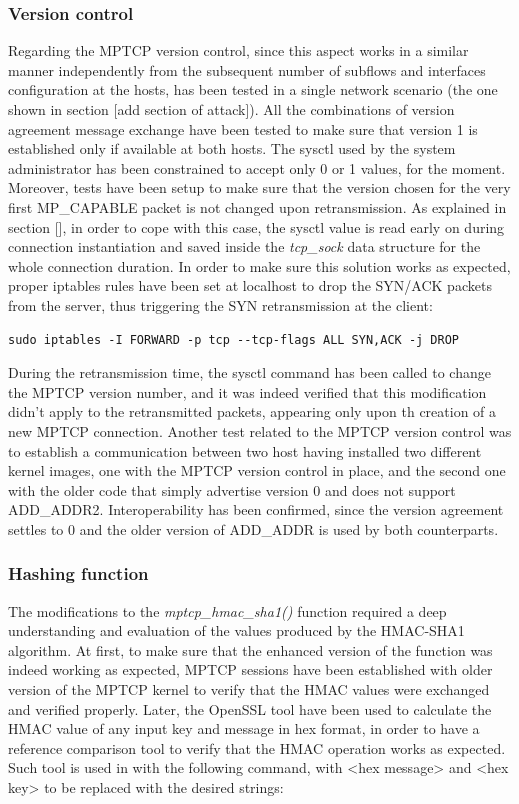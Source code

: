 \subsubsection{Version control}
Regarding the MPTCP version control, since this aspect works in a similar manner independently from the subsequent number of subflows and interfaces configuration at the hosts, has been tested in a single network scenario (the one shown in section [add section of attack]). All the combinations of version agreement message exchange have been tested to make sure that version 1 is established only if available at both hosts. The sysctl used by the system administrator has been constrained to accept only 0 or 1 values, for the moment. Moreover, tests have been setup to make sure that the version chosen for the very first MP\_CAPABLE packet is not changed upon retransmission. As explained in section [], in order to cope with this case, the sysctl value is read early on during connection instantiation and saved inside the \textit{tcp\_sock} data structure for the whole connection duration. In order to make sure this solution works as expected, proper iptables rules have been set at localhost to drop the SYN/ACK packets from the server, thus triggering the SYN retransmission at the client: 

\begin{verbatim}
sudo iptables -I FORWARD -p tcp --tcp-flags ALL SYN,ACK -j DROP
\end{verbatim}

During the retransmission time, the sysctl command has been called to change the MPTCP version number, and it was indeed verified that this modification didn't apply to the retransmitted packets, appearing only upon th creation of a new MPTCP connection. 
Another test related to the MPTCP version control was to establish a communication between two host having installed two different kernel images, one with the MPTCP version control in place, and the second one with the older code that simply advertise version 0 and does not support ADD\_ADDR2. Interoperability has been confirmed, since the version agreement settles to 0 and the older version of ADD\_ADDR is used by both counterparts.

\subsubsection{Hashing function}
The modifications to the \textit{mptcp\_hmac\_sha1()} function required a deep understanding and evaluation of the values produced by the HMAC-SHA1 algorithm. At first, to make sure that the enhanced version of the function was indeed working as expected, MPTCP sessions have been established with older version of the MPTCP kernel to verify that the HMAC values were exchanged and verified properly. Later, the OpenSSL tool have been used to calculate the HMAC value of any input key and message in hex format, in order to have a reference comparison tool to verify that the HMAC operation works as expected. Such tool is used in with the following command, with <hex message> and <hex key> to be replaced with the desired strings:

